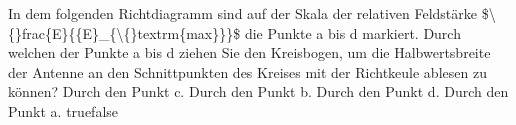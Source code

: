     {In dem folgenden Richtdiagramm sind auf der Skala der relativen Feldstärke \$\textbackslash\{\}frac\{E\}\{\{E\}\_\{\textbackslash\{\}textrm\{max\}\}\}\$ die Punkte a bis d markiert. Durch welchen der Punkte a bis d ziehen Sie den Kreisbogen, um die Halbwertsbreite der Antenne an den Schnittpunkten des Kreises mit der Richtkeule ablesen zu können?}
    {Durch den Punkt c.}
    {Durch den Punkt b.}
    {Durch den Punkt d.}
    {Durch den Punkt a.}
    {true}{false}